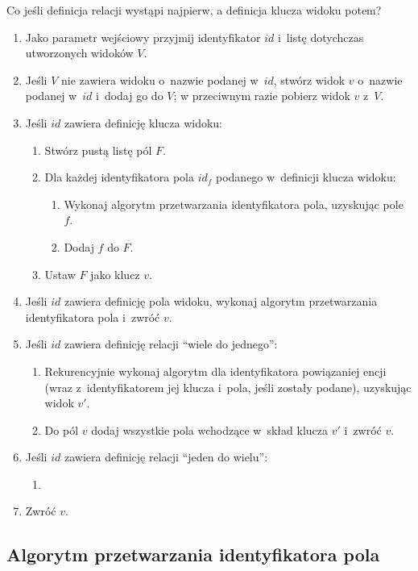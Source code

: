 Co jeśli definicja relacji wystąpi najpierw, a definicja klucza widoku potem?

\begin{enumerate}
 \item Jako parametr wejściowy przyjmij identyfikator $id$ i~listę dotychczas utworzonych widoków $V$.
 \item Jeśli $V$ nie zawiera widoku o~nazwie podanej w~$id$, stwórz widok $v$ o~nazwie podanej w~$id$ i~dodaj go do $V$; w przeciwnym razie pobierz widok $v$ z~$V$.
 \item Jeśli $id$ zawiera definicję klucza widoku:
  \begin{enumerate}
   \item Stwórz pustą listę pól $F$.
   \item Dla każdej identyfikatora pola $id_f$ podanego w~definicji klucza widoku:
    \begin{enumerate}
     \item Wykonaj algorytm przetwarzania identyfikatora pola, uzyskując pole $f$.
     \item Dodaj $f$ do $F$.
    \end{enumerate}
   \item Ustaw $F$ jako klucz $v$.
  \end{enumerate}
 \item Jeśli $id$ zawiera definicję pola widoku, wykonaj algorytm przetwarzania identyfikatora pola i~zwróć $v$.
 \item Jeśli $id$ zawiera definicję relacji ``wiele do jednego'':
  \begin{enumerate}
   \item Rekurencyjnie wykonaj algorytm dla identyfikatora powiązaniej encji (wraz z~identyfikatorem jej klucza i~pola, jeśli zostały podane), uzyskując widok $v'$.
   \item Do pól $v$ dodaj wszystkie pola wchodzące w~skład klucza $v'$ i~zwróć $v$.
  \end{enumerate}
 \item Jeśli $id$ zawiera definicję relacji ``jeden do wielu'':
  \begin{enumerate}
   \item 
  \end{enumerate}

 \item Zwróć $v$.
\end{enumerate}


\subsection{Algorytm przetwarzania identyfikatora pola}

